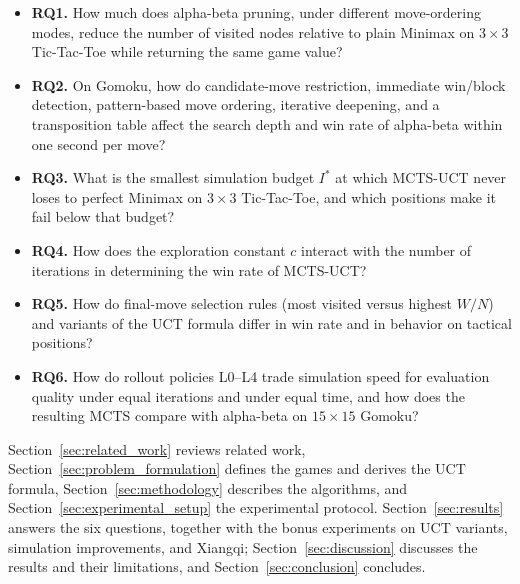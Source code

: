\begin{itemize}
    \item \textbf{RQ1.} How much does alpha-beta pruning, under different move-ordering modes, reduce the number of visited nodes relative to plain Minimax on $3\times 3$ Tic-Tac-Toe while returning the same game value?
    \item \textbf{RQ2.} On Gomoku, how do candidate-move restriction, immediate win/block detection, pattern-based move ordering, iterative deepening, and a transposition table affect the search depth and win rate of alpha-beta within one second per move?
    \item \textbf{RQ3.} What is the smallest simulation budget $I^*$ at which MCTS-UCT never loses to perfect Minimax on $3\times 3$ Tic-Tac-Toe, and which positions make it fail below that budget?
    \item \textbf{RQ4.} How does the exploration constant $c$ interact with the number of iterations in determining the win rate of MCTS-UCT?
    \item \textbf{RQ5.} How do final-move selection rules (most visited versus highest $W/N$) and variants of the UCT formula differ in win rate and in behavior on tactical positions?
    \item \textbf{RQ6.} How do rollout policies L0--L4 trade simulation speed for evaluation quality under equal iterations and under equal time, and how does the resulting MCTS compare with alpha-beta on $15\times 15$ Gomoku?
\end{itemize}

Section~\ref{sec:related_work} reviews related work, Section~\ref{sec:problem_formulation} defines the games and derives the UCT formula, Section~\ref{sec:methodology} describes the algorithms, and Section~\ref{sec:experimental_setup} the experimental protocol. Section~\ref{sec:results} answers the six questions, together with the bonus experiments on UCT variants, simulation improvements, and Xiangqi; Section~\ref{sec:discussion} discusses the results and their limitations, and Section~\ref{sec:conclusion} concludes.

